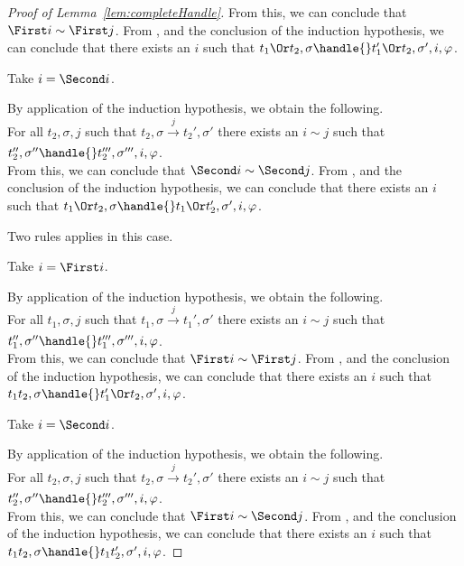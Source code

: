 \begin{proof}[Proof of Lemma~\ref{lem:completeHandle}]
{{    From this, we can conclude that $\First i\sim \First j$.
    From , and the conclusion of the induction hypothesis,
    we can conclude that there exists an $i$ such that $t_1\Or t_2,\sigma\handle{}t_1'\Or t_2,\sigma',i,\phi$.
    }
    {
    Take $i=\Second i$.

    By application of the induction hypothesis, we obtain the following.\\
    For all $t_2,\sigma,j$ such that $t_2,\sigma\xrightarrow[]{j}t_2',\sigma'$ there exists an $i\sim j$ such that $t_2'',\sigma''\handle{}t_2''',\sigma''',i,\phi$.\\

    From this, we can conclude that $\Second i\sim \Second j$.
    From , and the conclusion of the induction hypothesis,
    we can conclude that there exists an $i$ such that $t_1\Or t_2,\sigma\handle{}t_1\Or t_2',\sigma',i,\phi$.
    }
    }
    {
    Two rules applies in this case.\\
    {
    Take $i=\First i$.

    By application of the induction hypothesis, we obtain the following.\\
    For all $t_1,\sigma,j$ such that $t_1,\sigma\xrightarrow[]{j}t_1',\sigma'$ there exists an $i\sim j$ such that $t_1'',\sigma''\handle{}t_1''',\sigma''',i,\phi$.\\

    From this, we can conclude that $\First i\sim \First j$.
    From , and the conclusion of the induction hypothesis,
    we can conclude that there exists an $i$ such that $t_1\And t_2,\sigma\handle{}t_1'\Or t_2,\sigma',i,\phi$.
    }
    {
    Take $i=\Second i$.

    By application of the induction hypothesis, we obtain the following.\\
    For all $t_2,\sigma,j$ such that $t_2,\sigma\xrightarrow[]{j}t_2',\sigma'$ there exists an $i\sim j$ such that $t_2'',\sigma''\handle{}t_2''',\sigma''',i,\phi$.\\

    From this, we can conclude that $\First i\sim \Second j$.
    From , and the conclusion of the induction hypothesis,
    we can conclude that there exists an $i$ such that $t_1\And t_2,\sigma\handle{}t_1\And t_2',\sigma',i,\phi$.
    }
    }

\end{proof}



